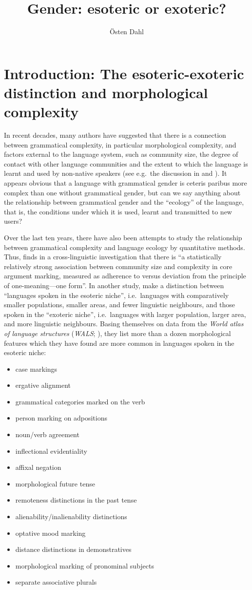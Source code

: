 \documentclass[output=collectionpaper]{langsci/langscibook}
\title{Gender: esoteric or exoteric?}
\author{%
Östen Dahl
\affiliation{Stockholm University}
}%
\begin{document}
\section{Introduction: The esoteric-exoteric distinction and morphological complexity}

In recent decades, many authors have suggested that there is a connection between grammatical complexity, in particular morphological complexity, and factors external to the language system, such as community size, the degree of contact with other language communities and the extent to which the language is learnt and used by non-native speakers (see e.g.\ the discussion in \citealt{Trudgill1983} and \citealt{Dahl2004}). It appears obvious that a language with grammatical gender is ceteris paribus more complex than one without grammatical gender, but can we say anything about the relationship between grammatical gender and the ``ecology'' of the language, that is, the conditions under which it is used, learnt and transmitted to new users?

 Over the last ten years, there have also been attempts to study the relationship between grammatical complexity and language ecology by quantitative methods. Thus, \citet[138]{Sinnemaeki2009} finds in a cross-linguistic investigation that there is ``a statistically relatively strong association between community size and complexity in core argument marking, measured as adherence to versus deviation from the principle of one-meaning—one form''. In another study, \citet{Lupyan2010} make a distinction between ``languages spoken in the esoteric niche'', i.e.\ languages with comparatively smaller populations, smaller areas, and fewer linguistic neighbours, and those spoken in the ``exoteric niche'', i.e.\ languages with larger population, larger area, and more linguistic neighbours. Basing themselves on data from the \textit{World atlas of language structures} (\textit{WALS}; \citealt{Dryer2013}), they list more than a dozen morphological features which they have found are more common in languages spoken in the esoteric niche:

\begin{itemize}
\item
case markings
\item
ergative alignment
\item
grammatical categories marked on the verb
\item
person marking on adpositions
\item
noun/verb agreement
\item
inflectional evidentiality
\item
affixal negation
\item
morphological future tense
\item
remoteness distinctions in the past tense
\item
alienability/inalienability distinctions
\item
optative mood marking
\item
distance distinctions in demonstratives
\item
morphological marking of pronominal subjects
\item
separate associative plurals
\end{itemize}
\end{document}
